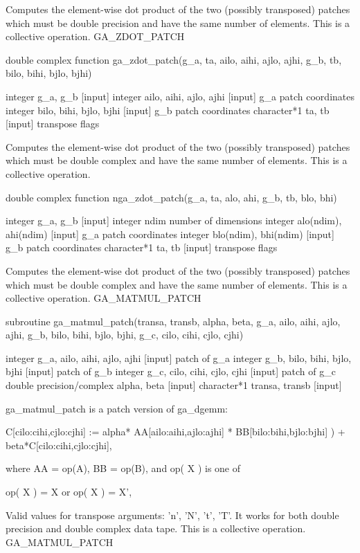 Computes the element-wise dot product of the two (possibly transposed)
patches which must be double precision and have the same number of
elements. This is a collective operation. GA\_ZDOT\_PATCH

double complex function ga\_zdot\_patch(g\_a, ta, ailo, aihi, ajlo,
ajhi, g\_b, tb, bilo, bihi, bjlo, bjhi)

integer g\_a, g\_b {[}input{]} integer ailo, aihi, ajlo, ajhi {[}input{]}
g\_a patch coordinates integer bilo, bihi, bjlo, bjhi {[}input{]}
g\_b patch coordinates character{*}1 ta, tb {[}input{]} transpose
flags

Computes the element-wise dot product of the two (possibly transposed)
patches which must be double complex and have the same number of elements.
This is a collective operation.

double complex function nga\_zdot\_patch(g\_a, ta, alo, ahi, g\_b,
tb, blo, bhi)

integer g\_a, g\_b {[}input{]} integer ndim number of dimensions integer
alo(ndim), ahi(ndim) {[}input{]} g\_a patch coordinates integer blo(ndim),
bhi(ndim) {[}input{]} g\_b patch coordinates character{*}1 ta, tb
{[}input{]} transpose flags

Computes the element-wise dot product of the two (possibly transposed)
patches which must be double complex and have the same number of elements.
This is a collective operation. GA\_MATMUL\_PATCH

subroutine ga\_matmul\_patch(transa, transb, alpha, beta, g\_a, ailo,
aihi, ajlo, ajhi, g\_b, bilo, bihi, bjlo, bjhi, g\_c, cilo, cihi,
cjlo, cjhi)

integer g\_a, ailo, aihi, ajlo, ajhi {[}input{]} patch of g\_a integer
g\_b, bilo, bihi, bjlo, bjhi {[}input{]} patch of g\_b integer g\_c,
cilo, cihi, cjlo, cjhi {[}input{]} patch of g\_c double precision/complex
alpha, beta {[}input{]} character{*}1 transa, transb {[}input{]}

ga\_matmul\_patch is a patch version of ga\_dgemm:

C{[}cilo:cihi,cjlo:cjhi{]} := alpha{*} AA{[}ailo:aihi,ajlo:ajhi{]}
{*} BB{[}bilo:bihi,bjlo:bjhi{]} ) + beta{*}C{[}cilo:cihi,cjlo:cjhi{]},

where AA = op(A), BB = op(B), and op( X ) is one of

op( X ) = X or op( X ) = X',

Valid values for transpose arguments: 'n', 'N', 't', 'T'. It works
for both double precision and double complex data tape. This is a
collective operation. GA\_MATMUL\_PATCH

